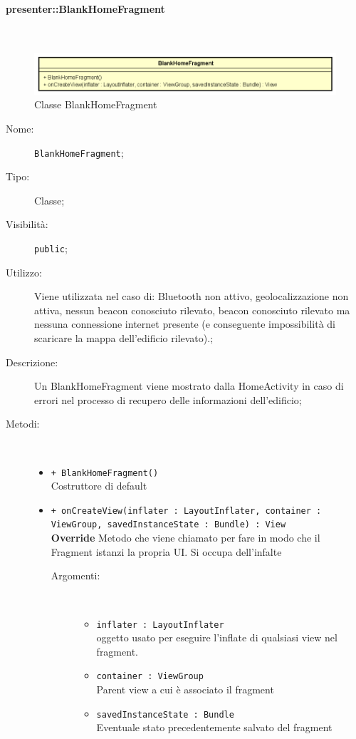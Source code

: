 \documentclass[../DefinizioneDiProdotto.tex]{subfiles}
\begin{document}
\paragraph{presenter::BlankHomeFragment}
\
\begin{figure}[H]
	\centering
	\includegraphics[width=\maxwidth]{img/BlankHomeFragment.png}
	\caption{Classe BlankHomeFragment}\label{fig:presenter::BlankHomeFragment} 
\end{figure}
\begin{description}
	\item[Nome:] \texttt{BlankHomeFragment};
	\item[Tipo:] Classe;
	\item[Visibilità:] \texttt{public};
	\item[Utilizzo:] Viene utilizzata nel caso di: Bluetooth non attivo, geolocalizzazione non attiva, nessun beacon conosciuto rilevato, beacon conosciuto rilevato ma nessuna connessione internet presente (e conseguente impossibilità di scaricare la mappa dell'edificio rilevato).;
	\item[Descrizione:] Un BlankHomeFragment viene mostrato dalla HomeActivity in caso di errori nel processo di recupero delle informazioni dell'edificio;
	\item[Metodi:] \
	\begin{itemize}
		\item \texttt{+ BlankHomeFragment()}\\
		Costruttore di default
		\item \texttt{+ onCreateView(inflater : LayoutInflater, container : ViewGroup, savedInstanceState : Bundle) : View}\\
		\textbf{Override} Metodo che viene chiamato per fare in modo che il Fragment istanzi la propria UI. Si occupa dell'infalte
		\begin{description}
			\item[Argomenti:] \
			\begin{itemize}
				\item \texttt{inflater : LayoutInflater}\\
				oggetto usato per eseguire l'inflate di qualsiasi view nel fragment.\item \texttt{container : ViewGroup}\\
				Parent view a cui è associato il fragment\item \texttt{savedInstanceState : Bundle}\\
				Eventuale stato precedentemente salvato del fragment\end{itemize}
		\end{description}
	\end{itemize}
\end{description}
\end{document}
